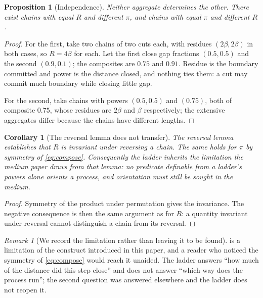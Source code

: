 \documentclass[11pt,twocolumn,a4paper]{article}
\theoremstyle{plain}
\newtheorem{proposition}[theorem]{Proposition}
\newtheorem{corollary}[theorem]{Corollary}
\theoremstyle{definition}
\theoremstyle{remark}
\newtheorem{remark}[theorem]{Remark}
\newcommand{\flo}{\beta}
\newcommand{\pow}{\pi}
\begin{document}
\begin{proposition}[Independence]
\label{prop:independent}
Neither aggregate determines the other. There exist chains with equal $R$ and
different $\pow$, and chains with equal $\pow$ and different $R$.
\end{proposition}

\begin{proof}
For the first, take two chains of two cuts each, with residues $(2\flo,2\flo)$
in both cases, so $R=4\flo$ for each. Let the first close gap fractions
$(0.5,0.5)$ and the second $(0.9,0.1)$; the composites are $0.75$ and $0.91$.
Residue is the boundary committed and power is the distance closed, and nothing
ties them: a cut may commit much boundary while closing little gap.

For the second, take chains with powers $(0.5,0.5)$ and $(0.75)$, both of
composite $0.75$, whose residues are $2\flo$ and $\flo$ respectively; the
extensive aggregates differ because the chains have different lengths.
\end{proof}

\begin{corollary}[The reversal lemma does not transfer]
\label{cor:reversal-transfer}
The reversal lemma establishes that $R$ is invariant under reversing a chain.
The same holds for $\pow$ by symmetry of \cref{eq:compose}. Consequently the
ladder inherits the limitation the medium paper draws from that lemma: no
predicate definable from a ladder's powers alone orients a process, and
orientation must still be sought in the medium.
\end{corollary}

\begin{proof}
Symmetry of the product under permutation gives the invariance. The negative
consequence is then the same argument as for $R$: a quantity invariant under
reversal cannot distinguish a chain from its reversal.
\end{proof}

\begin{remark}[We record the limitation rather than leaving it to be found]
\label{rem:limitation-inherited}
 is a limitation of the construct introduced in
this paper, and a reader who noticed the symmetry of \cref{eq:compose} would
reach it unaided. The ladder answers ``how much of the distance did this step
close'' and does not answer ``which way does the process run''; the second
question was answered elsewhere and the ladder does not reopen it.
\end{remark}
\end{document}
